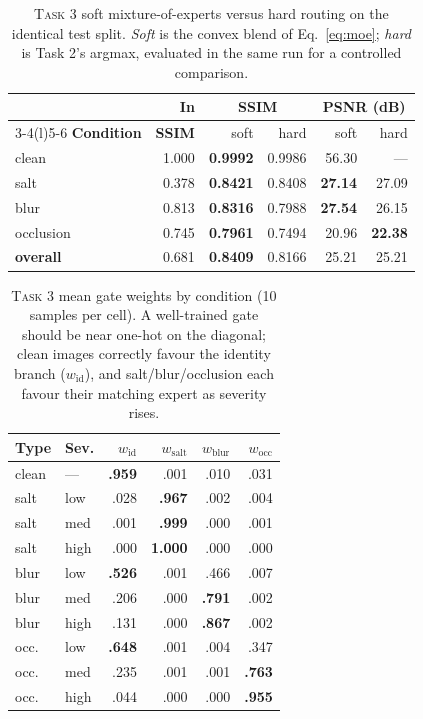 \documentclass[journal]{IEEEtran}
\newcommand{\taskname}[1]{\textsc{#1}}
\begin{document}
\begin{table}[t]
\caption{\taskname{Task 3} soft mixture-of-experts versus hard routing on the identical test split. \emph{Soft} is the convex blend of Eq.~\eqref{eq:moe}; \emph{hard} is Task 2's argmax, evaluated in the same run for a controlled comparison.}
\label{tab:t3}
\centering
\scriptsize
\setlength{\tabcolsep}{3.0pt}
\begin{tabular}{@{}lrrrrr@{}}
\toprule
& \textbf{In} & \multicolumn{2}{c}{\textbf{SSIM}} & \multicolumn{2}{c}{\textbf{PSNR (dB)}}\\
\cmidrule(l){3-4}\cmidrule(l){5-6}
\textbf{Condition} & \textbf{SSIM} & soft & hard & soft & hard\\
\midrule
clean     & 1.000 & \textbf{0.9992} & 0.9986 & 56.30 & ---\\
salt      & 0.378 & \textbf{0.8421} & 0.8408 & \textbf{27.14} & 27.09\\
blur      & 0.813 & \textbf{0.8316} & 0.7988 & \textbf{27.54} & 26.15\\
occlusion & 0.745 & \textbf{0.7961} & 0.7494 & 20.96 & \textbf{22.38}\\
\midrule
\textbf{overall} & 0.681 & \textbf{0.8409} & 0.8166 & 25.21 & 25.21\\
\bottomrule
\end{tabular}
\end{table}

\begin{table}[t]
\caption{\taskname{Task 3} mean gate weights by condition (10 samples per cell). A well-trained gate should be near one-hot on the diagonal; clean images correctly favour the identity branch ($w_{\text{id}}$), and salt/blur/occlusion each favour their matching expert as severity rises.}
\label{tab:gate}
\centering
\scriptsize
\setlength{\tabcolsep}{2.4pt}
\begin{tabular}{@{}llrrrr@{}}
\toprule
\textbf{Type} & \textbf{Sev.} & $w_{\text{id}}$ & $w_{\text{salt}}$ & $w_{\text{blur}}$ & $w_{\text{occ}}$\\
\midrule
clean & ---  & \textbf{.959} & .001 & .010 & .031\\
salt & low  & .028 & \textbf{.967} & .002 & .004\\
salt & med  & .001 & \textbf{.999} & .000 & .001\\
salt & high & .000 & \textbf{1.000} & .000 & .000\\
blur & low  & \textbf{.526} & .001 & .466 & .007\\
blur & med  & .206 & .000 & \textbf{.791} & .002\\
blur & high & .131 & .000 & \textbf{.867} & .002\\
occ. & low  & \textbf{.648} & .001 & .004 & .347\\
occ. & med  & .235 & .001 & .001 & \textbf{.763}\\
occ. & high & .044 & .000 & .000 & \textbf{.955}\\
\bottomrule
\end{tabular}
\end{table}
\end{document}
